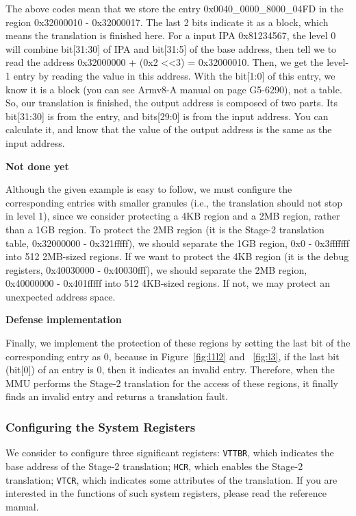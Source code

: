 The above codes mean that we store the entry 0x0040\_0000\_8000\_04FD in the region 0x32000010 - 0x32000017.
The last 2 bits indicate it as a block, which means the translation is finished here.
For a input IPA 0x81234567, the level 0 will combine 
bit[31:30] of IPA and bit[31:5] of the base address, then tell we to read the address 0x32000000 + (0x2 \textless \textless 3) = 0x32000010. Then, we get the level-1 entry by reading the value in this address.
With the bit[1:0] of this entry, we know it is a block (you can see Armv8-A manual on page G5-6290), not a table. So, our translation is finished, the output address is composed of two parts. Its bit[31:30] is from the entry, and bits[29:0] is from the input address. You can calculate it, and know that the value of the output address is the same as the input address.

\vspace{10pt}
\textbf{Not done yet}
\vspace{10pt}

Although the given example is easy to follow, we must configure the corresponding entries with smaller granules (i.e., the translation should not stop in level 1), since we consider protecting a 4KB region and a 2MB region, rather than a 1GB region.
To protect the 2MB region (it is the Stage-2 translation table, 0x32000000 - 0x321fffff), we should separate the 1GB region, 0x0 - 0x3fffffff into 512 2MB-sized regions. If we want to protect the 4KB region (it is the debug registers, 0x40030000 - 0x40030fff), we should separate the 2MB region, 0x40000000 - 0x401fffff into 512 4KB-sized regions. If not, we may protect an unexpected address space.


\vspace{10pt}
\textbf{Defense implementation}
\vspace{10pt}



Finally, we implement the protection of these regions by setting the last bit of the corresponding entry as 0, because in Figure~\ref{fig:l1l2} and ~\ref{fig:l3}, if the last bit (bit[0]) of an entry is 0, then it indicates an invalid entry. Therefore, when the MMU performs the Stage-2 translation for the access of these regions, it finally finds an invalid entry and returns a translation fault.

\subsubsection{Configuring the System Registers}
We consider to configure three significant registers: \texttt{VTTBR}, which indicates the base address of the Stage-2 translation; \texttt{HCR}, which enables the Stage-2 translation; \texttt{VTCR}, which indicates some attributes of the translation. If you are interested in the functions of such system registers, please read the reference manual.

